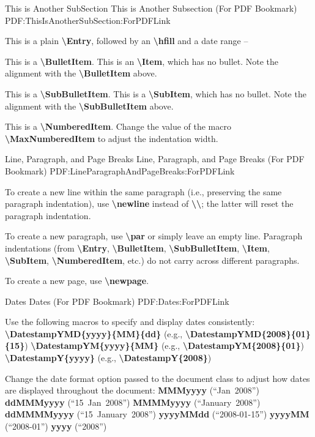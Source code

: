 \documentclass[letterpaper,MMMyyyy,nonstopmode]{simpleresumecv}
\newcommand{\Code}[1]{\mbox{\textbf{#1}}}
\newcommand{\CodeCommand}[1]{\mbox{\textbf{\textbackslash{#1}}}}
\begin{document}
\begin{Body}
\BigGap
\SubSection
{This is Another SubSection}
{This is Another Subsection (For PDF Bookmark)}
{PDF:ThisIsAnotherSubSection:ForPDFLink}

\Gap
\Entry
This is a plain \CodeCommand{Entry},
followed by an \CodeCommand{hfill} and a date range
\hfill
{} --

\Gap
\BulletItem
This is a \CodeCommand{BulletItem}.
\Item
This is an \CodeCommand{Item}, which has no bullet.
Note the alignment with the \CodeCommand{BulletItem} above.

\Gap
\SubBulletItem
This is a \CodeCommand{SubBulletItem}.
\SubItem
This is a \CodeCommand{SubItem}, which has no bullet.
Note the alignment with the \CodeCommand{SubBulletItem} above.

\Gap
\NumberedItem{[42]}
This is a \CodeCommand{NumberedItem}.
Change the value of the macro \CodeCommand{MaxNumberedItem} to adjust the indentation width.

\BigGap
\SubSection
{Line, Paragraph, and Page Breaks}
{Line, Paragraph, and Page Breaks (For PDF Bookmark)}
{PDF:LineParagraphAndPageBreaks:ForPDFLink}

\Gap
\BulletItem
To create a new line within the same paragraph (i.e., preserving the same paragraph indentation), use \CodeCommand{newline} instead of \CodeCommand{\textbackslash};
the latter will reset the paragraph indentation.

\Gap
\BulletItem
To create a new paragraph, use \CodeCommand{par} or simply leave an empty line.
Paragraph indentations (from
\CodeCommand{Entry},
\CodeCommand{BulletItem},
\CodeCommand{SubBulletItem},
\CodeCommand{Item},
\CodeCommand{SubItem},
\CodeCommand{NumberedItem},
etc.) do not carry across different paragraphs.

\Gap
\BulletItem
To create a new page, use \CodeCommand{newpage}.

\BigGap
\SubSection
{Dates}
{Dates (For PDF Bookmark)}
{PDF:Dates:ForPDFLink}

\Gap
\BulletItem
Use the following macros to specify and display dates consistently:
\SubBulletItem
\CodeCommand{DatestampYMD\{yyyy\}\{MM\}\{dd\}}
(e.g., \CodeCommand{DatestampYMD\{2008\}\{01\}\{15\}})
\SubBulletItem
\CodeCommand{DatestampYM\{yyyy\}\{MM\}}
(e.g., \CodeCommand{DatestampYM\{2008\}\{01\}})
\SubBulletItem
\CodeCommand{DatestampY\{yyyy\}}
(e.g., \CodeCommand{DatestampY\{2008\}})

\Gap
\BulletItem
Change the date format option passed to the document class to adjust how dates are displayed throughout the document:
\SubBulletItem
\Code{MMMyyyy} (``Jan~2008'')
\SubBulletItem
\Code{ddMMMyyyy} (``15~Jan~2008'')
\SubBulletItem
\Code{MMMMyyyy} (``January~2008'')
\SubBulletItem
\Code{ddMMMMyyyy} (``15~January~2008'')
\SubBulletItem
\Code{yyyyMMdd} (``2008-01-15'')
\SubBulletItem
\Code{yyyyMM} (``2008-01'')
\SubBulletItem
\Code{yyyy} (``2008'')

\endgroup

\fi

\end{Body}
\end{document}
